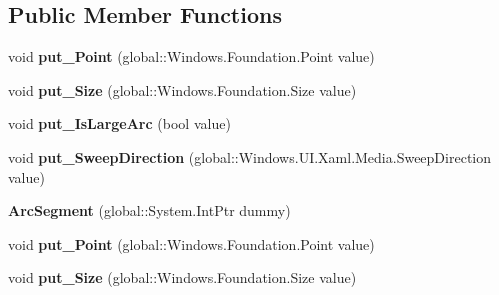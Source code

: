 \subsection*{Public Member Functions}
\begin{DoxyCompactItemize}
\item 
\mbox{\label{class_windows_1_1_u_i_1_1_xaml_1_1_media_1_1_arc_segment_ae3cc83e3cf50e15df1a76fe35abd93c5}} 
void {\bfseries put\+\_\+\+Point} (global\+::\+Windows.\+Foundation.\+Point value)
\item 
\mbox{\label{class_windows_1_1_u_i_1_1_xaml_1_1_media_1_1_arc_segment_af67de1df1942a7178681283b9126b59e}} 
void {\bfseries put\+\_\+\+Size} (global\+::\+Windows.\+Foundation.\+Size value)
\item 
\mbox{\label{class_windows_1_1_u_i_1_1_xaml_1_1_media_1_1_arc_segment_acd90b8a046abf2f9ce5f5d8f96ef7518}} 
void {\bfseries put\+\_\+\+Is\+Large\+Arc} (bool value)
\item 
\mbox{\label{class_windows_1_1_u_i_1_1_xaml_1_1_media_1_1_arc_segment_a82728182889ceaef7ff54beab34e9b94}} 
void {\bfseries put\+\_\+\+Sweep\+Direction} (global\+::\+Windows.\+U\+I.\+Xaml.\+Media.\+Sweep\+Direction value)
\item 
\mbox{\label{class_windows_1_1_u_i_1_1_xaml_1_1_media_1_1_arc_segment_a429457ddfea0ab424e587c2be0398db2}} 
{\bfseries Arc\+Segment} (global\+::\+System.\+Int\+Ptr dummy)
\item 
\mbox{\label{class_windows_1_1_u_i_1_1_xaml_1_1_media_1_1_arc_segment_ae3cc83e3cf50e15df1a76fe35abd93c5}} 
void {\bfseries put\+\_\+\+Point} (global\+::\+Windows.\+Foundation.\+Point value)
\item 
\mbox{\label{class_windows_1_1_u_i_1_1_xaml_1_1_media_1_1_arc_segment_af67de1df1942a7178681283b9126b59e}} 
void {\bfseries put\+\_\+\+Size} (global\+::\+Windows.\+Foundation.\+Size value)

\end{DoxyCompactItemize}
